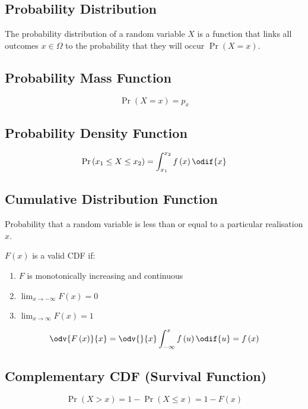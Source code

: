 \documentclass{article}
\begin{document}
\begin{multicols}{3}
        \subsection{Probability Distribution}
        The probability distribution of a random variable \(X\) is a function that links all outcomes \(x \in \Omega\)
        to the probability that they will occur \(\Pr{\left( X = x \right)}\).
        \subsection{Probability Mass Function}
        \begin{equation*}
            \Pr{\left( X = x \right)} = p_x
        \end{equation*}
        \subsection{Probability Density Function}
        \begin{equation*}
            \Pr{\left( x_1 \leq X \leq x_2 \right)} = \int_{x_1}^{x_2} f\left( x \right) \odif{x}
        \end{equation*}
        \subsection{Cumulative Distribution Function}
        Probability that a random variable is
        less than or equal to a particular realisation \(x\).

        \(F\left( x \right)\) is a valid CDF if:
        \begin{enumerate}
            \item \(F\) is monotonically increasing and continuous
            \item \(\lim_{x \to -\infty} F\left( x \right) = 0\)
            \item \(\lim_{x \to \infty} F\left( x \right) = 1\)
        \end{enumerate}
        \begin{equation*}
            \odv{F\left( x \right)}{x} = \odv{}{x} \int_{-\infty}^x f\left( u \right) \odif{u} = f\left( x \right)
        \end{equation*}
        \subsection{Complementary CDF (Survival Function)}
        \begin{equation*}
            \Pr{\left( X > x \right)} = 1 - \Pr{\left( X \leq x \right)} = 1 - F\left( x \right)
        \end{equation*}

\end{multicols}
\end{document}
